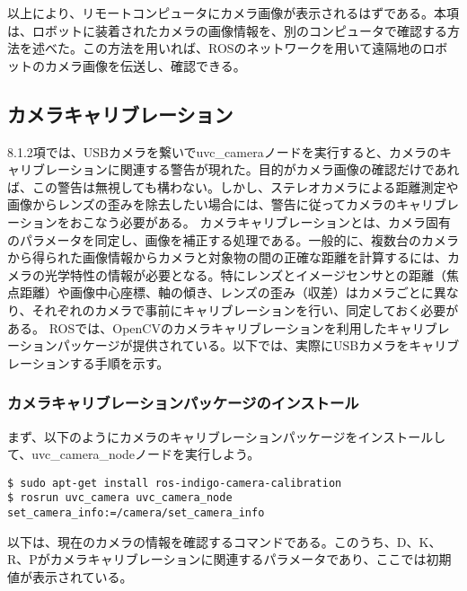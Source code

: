 以上により、リモートコンピュータにカメラ画像が表示されるはずである。本項は、ロボットに装着されたカメラの画像情報を、別のコンピュータで確認する方法を述べた。この方法を用いれば、ROSのネットワークを用いて遠隔地のロボットのカメラ画像を伝送し、確認できる。

\subsection{カメラキャリブレーション}

8.1.2項では、USBカメラを繋いでuvc\_cameraノードを実行すると、カメラのキャリブレーションに関連する警告が現れた。目的がカメラ画像の確認だけであれば、この警告は無視しても構わない。しかし、ステレオカメラによる距離測定や画像からレンズの歪みを除去したい場合には、警告に従ってカメラのキャリブレーションをおこなう必要がある。
カメラキャリブレーションとは、カメラ固有のパラメータを同定し、画像を補正する処理である。一般的に、複数台のカメラから得られた画像情報からカメラと対象物の間の正確な距離を計算するには、カメラの光学特性の情報が必要となる。特にレンズとイメージセンサとの距離（焦点距離）や画像中心座標、軸の傾き、レンズの歪み（収差）はカメラごとに異なり、それぞれのカメラで事前にキャリブレーションを行い、同定しておく必要がある。
ROSでは、OpenCVのカメラキャリブレーションを利用したキャリブレーションパッケージが提供されている。以下では、実際にUSBカメラをキャリブレーションする手順を示す。

\subsubsection{カメラキャリブレーションパッケージのインストール}

まず、以下のようにカメラのキャリブレーションパッケージをインストールして、uvc\_camera\_nodeノードを実行しよう。

\begin{lstlisting}[language=ROS]
$ sudo apt-get install ros-indigo-camera-calibration
$ rosrun uvc_camera uvc_camera_node set_camera_info:=/camera/set_camera_info
\end{lstlisting}

以下は、現在のカメラの情報を確認するコマンドである。このうち、D、K、R、Pがカメラキャリブレーションに関連するパラメータであり、ここでは初期値が表示されている。

